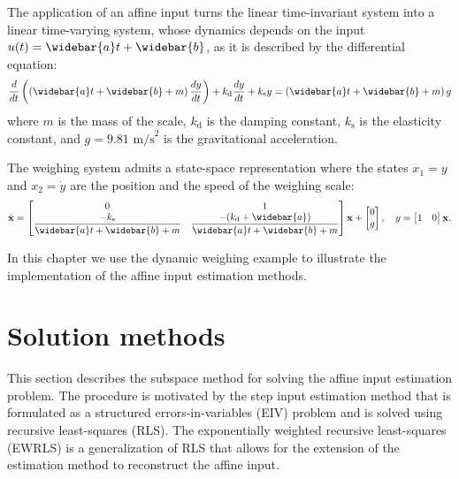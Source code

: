 The application of an affine input turns the linear time-invariant system into a linear time-varying system, whose
dynamics depends on the input $u(t) = \widebar{a} t + \widebar{b}$, as it is described by the differential equation:
\begin{equation} \dfrac{d}{dt} \left( \left( \widebar{a} t + \widebar{b} + m \right) \dfrac{dy}{dt} \right) + k_{\mathrm{d}} \dfrac{dy}{dt} + k_{\mathrm{s}} y = \left( \widebar{a} t + \widebar{b} + m \right) g \end{equation}
where $m$ is the mass of the scale, $k_{\mathrm{d}}$ is the damping constant, $k_{\mathrm{s}}$ is the elasticity constant, and $g = 9.81$ $\mathrm{m/s}^2$ is the gravitational acceleration. 

The weighing system admits a state-space representation where the states $x_1=y$ and $x_2=\dot{y}$ are the position and the speed of the weighing scale: 
\begin{equation} \dot{\mathbf{x}} = \begin{bmatrix} 0 & 1 \\ \dfrac{-k_{\mathrm{s}}}{\widebar{a} t + \widebar{b} + m} & \dfrac{-(k_{\mathrm{d}} + \widebar{a})}{\widebar{a} t + \widebar{b} + m} \end{bmatrix} \mathbf{x} + \begin{bmatrix} 0 \\ g \end{bmatrix}, \quad y = \begin{bmatrix} 1 & 0  \end{bmatrix} \mathbf{x} . \label{eqn:ltvsystem} \end{equation}

In this chapter we use the dynamic weighing example to illustrate the implementation of the affine input estimation methods.


\section{Solution methods}

This section describes the subspace method for solving the affine input estimation problem.
The procedure is motivated by the step input estimation method that is formulated as a structured errors-in-variables (EIV) problem and is solved using recursive least-squares (RLS).
The exponentially weighted recursive least-squares (EWRLS) is a generalization of RLS that allows for the extension of the estimation method to reconstruct the affine input.

